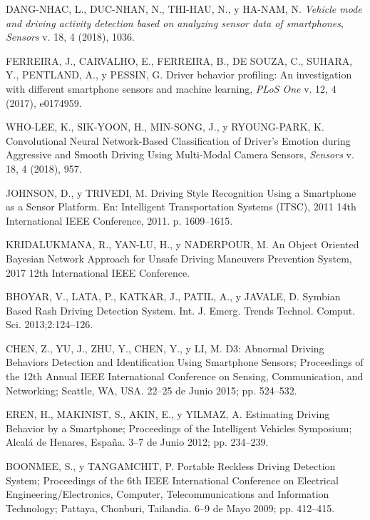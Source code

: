 
\begin{thebibliography}{9}
DANG-NHAC, L., DUC-NHAN, N., THI-HAU, N., y HA-NAM, N. \emph{Vehicle mode and driving activity detection based on analyzing sensor data of smartphones}, \textit{Sensors} v. 18, 4 (2018), 1036.

FERREIRA, J., CARVALHO, E., FERREIRA, B., DE SOUZA, C., SUHARA, Y., PENTLAND, A., y PESSIN, G. Driver behavior profiling: An investigation with different smartphone sensors and machine learning, \textit{PLoS One} v. 12, 4 (2017), e0174959.

WHO-LEE, K., SIK-YOON, H., MIN-SONG, J., y RYOUNG-PARK, K. Convolutional Neural Network-Based Classification of Driver’s Emotion during Aggressive and Smooth Driving Using Multi-Modal Camera Sensors, \textit{Sensors} v. 18, 4 (2018), 957.

JOHNSON, D., y TRIVEDI, M. Driving Style Recognition Using a Smartphone as a Sensor Platform. En: Intelligent Transportation Systems (ITSC), 2011 14th International IEEE Conference, 2011. p. 1609–1615.

KRIDALUKMANA, R., YAN-LU, H., y NADERPOUR, M. An Object Oriented Bayesian Network Approach for Unsafe Driving Maneuvers Prevention System, 2017 12th International IEEE Conference.

BHOYAR, V., LATA, P., KATKAR, J., PATIL, A., y JAVALE, D. Symbian Based Rash Driving Detection System. Int. J. Emerg. Trends Technol. Comput. Sci. 2013;2:124–126.

CHEN, Z., YU, J., ZHU, Y., CHEN, Y., y LI, M. D3: Abnormal Driving Behaviors Detection and Identification Using Smartphone Sensors; Proceedings of the 12th Annual IEEE International Conference on Sensing, Communication, and Networking; Seattle, WA, USA. 22–25 de Junio 2015; pp. 524–532.

EREN, H., MAKINIST, S., AKIN, E., y YILMAZ, A. Estimating Driving Behavior by a Smartphone; Proceedings of the Intelligent Vehicles Symposium; Alcalá de Henares, Espa\~{n}a. 3–7 de Junio 2012; pp. 234–239.

BOONMEE, S., y TANGAMCHIT, P. Portable Reckless Driving Detection System; Proceedings of the 6th IEEE International Conference on Electrical Engineering/Electronics, Computer, Telecommunications and Information Technology; Pattaya, Chonburi, Tailandia. 6–9 de Mayo 2009; pp. 412–415.


\end{thebibliography}
